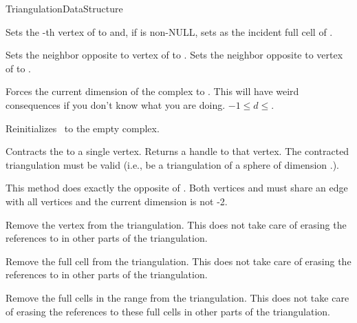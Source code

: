\begin{ccRefConcept}{TriangulationDataStructure}
\begin{ccAdvanced}
{Sets the -th vertex of  to  and, if  is non-NULL,
sets  as the incident full cell of .}

{Sets the neighbor opposite to vertex  of   to
. Sets the neighbor opposite to vertex  of 
 to .}

 { Forces the current dimension
of the complex to . This will have weird consequences if you don't know
what you are doing. 
\ccPrecond $-1\leq d\leq$.}

\end{ccAdvanced}


{Reinitializes \ccVar\ to the empty complex.}

 {Contracts the
 to a single vertex. Returns a handle to that vertex. \ccPrecond
The contracted triangulation must be valid ({i.e.}, be a triangulation of
a sphere of dimension \ccVar.).}

 {This method does exactly the opposite of
. \ccPrecond Both vertices  and
 must share an edge with all vertices and the current
dimension is not -2.}

\begin{ccAdvanced}

{Remove the vertex  from the triangulation. This does not take care of
erasing the references to  in other parts of the triangulation.}

{Remove the full cell  from the triangulation. This does not take care of
erasing the references to  in other parts of the triangulation.}

{Remove the full cells in the range \ccc{[start,end)} from the triangulation.
This does not take care of erasing the references to these full cells in other parts of
the triangulation.}


\end{ccAdvanced}
\end{ccRefConcept}
